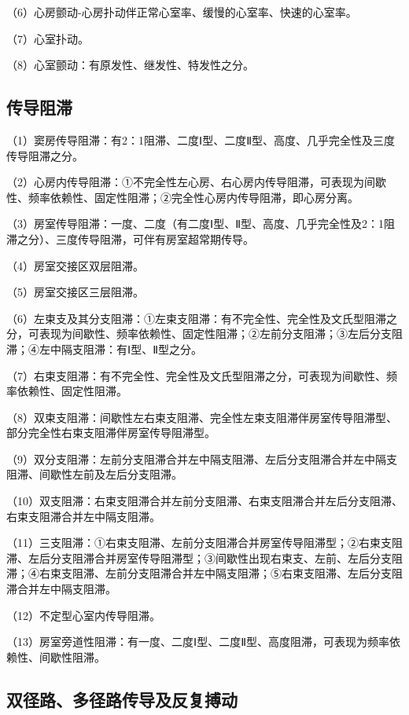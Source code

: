 （6）心房颤动-心房扑动伴正常心室率、缓慢的心室率、快速的心室率。

（7）心室扑动。

（8）心室颤动：有原发性、继发性、特发性之分。

\protect\hypertarget{text00057.htmlux5cux23subid695}{}{}

\subsection{传导阻滞}

（1）窦房传导阻滞：有2：1阻滞、二度Ⅰ型、二度Ⅱ型、高度、几乎完全性及三度传导阻滞之分。

（2）心房内传导阻滞：①不完全性左心房、右心房内传导阻滞，可表现为间歇性、频率依赖性、固定性阻滞；②完全性心房内传导阻滞，即心房分离。

（3）房室传导阻滞：一度、二度（有二度Ⅰ型、Ⅱ型、高度、几乎完全性及2：1阻滞之分）、三度传导阻滞，可伴有房室超常期传导。

（4）房室交接区双层阻滞。

（5）房室交接区三层阻滞。

（6）左束支及其分支阻滞：①左束支阻滞：有不完全性、完全性及文氏型阻滞之分，可表现为间歇性、频率依赖性、固定性阻滞；②左前分支阻滞；③左后分支阻滞；④左中隔支阻滞：有Ⅰ型、Ⅱ型之分。

（7）右束支阻滞：有不完全性、完全性及文氏型阻滞之分，可表现为间歇性、频率依赖性、固定性阻滞。

（8）双束支阻滞：间歇性左右束支阻滞、完全性左束支阻滞伴房室传导阻滞型、部分完全性右束支阻滞伴房室传导阻滞型。

（9）双分支阻滞：左前分支阻滞合并左中隔支阻滞、左后分支阻滞合并左中隔支阻滞、间歇性左前及左后分支阻滞。

（10）双支阻滞：右束支阻滞合并左前分支阻滞、右束支阻滞合并左后分支阻滞、右束支阻滞合并左中隔支阻滞。

（11）三支阻滞：①右束支阻滞、左前分支阻滞合并房室传导阻滞型；②右束支阻滞、左后分支阻滞合并房室传导阻滞型；③间歇性出现右束支、左前、左后分支阻滞；④右束支阻滞、左前分支阻滞合并左中隔支阻滞；⑤右束支阻滞、左后分支阻滞合并左中隔支阻滞。

（12）不定型心室内传导阻滞。

（13）房室旁道性阻滞：有一度、二度Ⅰ型、二度Ⅱ型、高度阻滞，可表现为频率依赖性、间歇性阻滞。

\protect\hypertarget{text00057.htmlux5cux23subid696}{}{}

\subsection{双径路、多径路传导及反复搏动}

